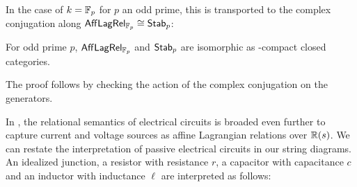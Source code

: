 In the case of $k=\mathbb{F}_p$ for $p$ an odd prime, this is transported to the complex conjugation along $\mathsf{Aff}\mathsf{Lag}\mathsf{Rel}_{\mathbb{F}_p} \cong {\sf Stab}_p$:



\begin{lemma}
For odd prime $p$, $\mathsf{Aff}\mathsf{Lag}\mathsf{Rel}_{\mathbb{F}_p}$ and  ${\sf Stab}_p$ are isomorphic as \dag-compact closed categories.
\end{lemma}

The proof follows by checking the action of the complex conjugation on the generators.



\begin{remark}
 In \cite{network}, the relational semantics of electrical circuits is broaded even further to capture current and voltage sources as affine Lagrangian relations over $\mathbb{R}(s)$.  We can restate the interpretation of passive electrical circuits in our string diagrams. An idealized junction, a resistor with resistance $r$, a capacitor with capacitance $c$ and an inductor with inductance $\ell$ are interpreted as follows:


\end{remark}
